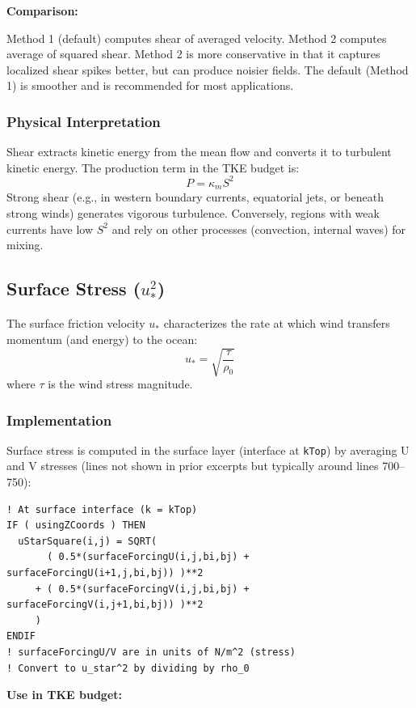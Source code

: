 \documentclass[12pt,letterpaper]{article}
\begin{document}
\textbf{Comparison:}

Method 1 (default) computes shear of averaged velocity. Method 2 computes
average of squared shear. Method 2 is more conservative in that it captures
localized shear spikes better, but can produce noisier fields. The default
(Method 1) is smoother and is recommended for most applications.

\subsubsection{Physical Interpretation}

Shear extracts kinetic energy from the mean flow and converts it to turbulent
kinetic energy. The production term in the TKE budget is:
\[
P = \kappa_m S^2
\]
Strong shear (e.g., in western boundary currents, equatorial jets, or beneath
strong winds) generates vigorous turbulence. Conversely, regions with weak
currents have low $S^2$ and rely on other processes (convection, internal
waves) for mixing.

\subsection{Surface Stress ($u_*^2$)}

The surface friction velocity $u_*$ characterizes the rate at which wind
transfers momentum (and energy) to the ocean:
\[
u_* = \sqrt{\frac{\tau}{\rho_0}}
\]
where $\tau$ is the wind stress magnitude.

\subsubsection{Implementation}

Surface stress is computed in the surface layer (interface at \texttt{kTop})
by averaging U and V stresses (lines not shown in prior excerpts but typically
around lines 700--750):

\begin{lstlisting}[caption={Conceptual code for surface stress (typically lines 700--750).}]
! At surface interface (k = kTop)
IF ( usingZCoords ) THEN
  uStarSquare(i,j) = SQRT(
       ( 0.5*(surfaceForcingU(i,j,bi,bj) + surfaceForcingU(i+1,j,bi,bj)) )**2
     + ( 0.5*(surfaceForcingV(i,j,bi,bj) + surfaceForcingV(i,j+1,bi,bj)) )**2
     )
ENDIF
! surfaceForcingU/V are in units of N/m^2 (stress)
! Convert to u_star^2 by dividing by rho_0
\end{lstlisting}

\textbf{Use in TKE budget:}
\end{document}
